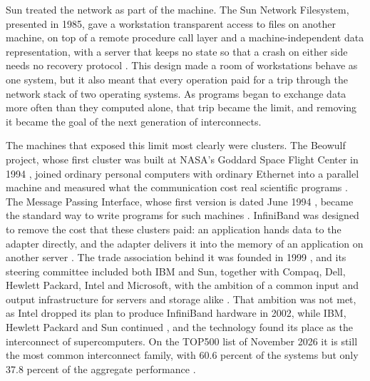 Sun treated the network as part of the machine. The Sun Network Filesystem, presented in 1985,
gave a workstation transparent access to files on another machine, on top of
a remote procedure call layer and a machine-independent data representation,
with a server that keeps no state so that a crash on either side needs no
recovery protocol \citep{sandberg1985nfs}. This design made a room of
workstations behave as one system, but it also meant that every operation
paid for a trip through the network stack of two operating systems. As
programs began to exchange data more often than they computed alone, that
trip became the limit, and removing it became the goal of the next
generation of interconnects.

The machines that exposed this limit most clearly were clusters. The Beowulf
project, whose first cluster was built at NASA's Goddard Space Flight Center
in 1994 \citep{fischer2014beowulf}, joined ordinary personal computers with
ordinary Ethernet into a parallel machine and measured what the
communication cost real scientific programs \citep{sterling1995beowulf}. The
Message Passing Interface, whose first version is dated June 1994
\citep{mpi1995}, became the standard way to write programs for such machines
\citep{mpiforum}.
InfiniBand was designed to remove the cost that these clusters paid: an
application hands data to the adapter directly, and the adapter delivers it
into the memory of an application on another server \citep{mellanox_ibwp}.
The trade association
behind it was founded in 1999 \citep{eweek2002infiniband}, and its steering
committee included both IBM and Sun, together with Compaq, Dell, Hewlett Packard, Intel and Microsoft, with the ambition of a common input and
output infrastructure for servers and storage alike \citep{mellanox_ibwp}.
That ambition was not met, as Intel dropped its plan to
produce InfiniBand hardware in 2002, while IBM, Hewlett Packard and Sun
continued \citep{eweek2002infiniband}, and the technology found its place as
the interconnect of supercomputers. On the TOP500 list of November 2026 it
is still the most common interconnect family, with 60.6 percent of the
systems but only 37.8 percent of the aggregate performance
\citep{sdx2026top500}.

